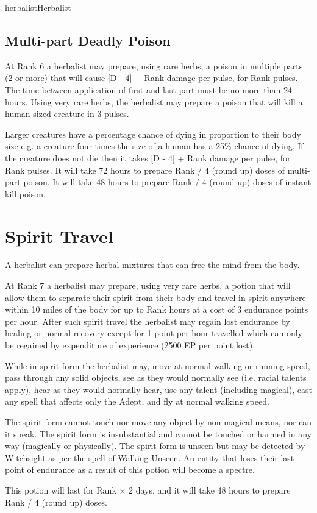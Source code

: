 \begin{Skill}[1.1]{herbalist}{Herbalist}
\subsection{Multi-part Deadly Poison}

At Rank 6 a herbalist may prepare, using rare herbs, a poison in
multiple parts (2 or more) that will cause [D - 4] + Rank damage per
pulse, for Rank pulses. The time between application of first and last
part must be no more than 24 hours. Using very rare herbs, the
herbalist may prepare a poison that will kill a human sized creature
in 3 pulses.

Larger creatures have a percentage chance of dying in proportion to
their body size e.g. a creature four times the size of a human has a
25\% chance of dying. If the creature does not die then it takes [D -
  4] + Rank damage per pulse, for Rank pulses.  It will take 72 hours
to prepare Rank / 4 (round up) doses of multi-part poison. It will
take 48 hours to prepare Rank / 4 (round up) doses of instant kill
poison.

\section{Spirit Travel}

A herbalist can prepare herbal mixtures that can free the mind from
the body.

At Rank 7 a herbalist may prepare, using very rare herbs, a potion
that will allow them to separate their spirit from their body and
travel in spirit anywhere within 10 miles of the body for up to Rank
hours at a cost of 3 endurance points per hour.  After such spirit
travel the herbalist may regain lost endurance by healing or normal
recovery except for 1 point per hour travelled which can only be
regained by expenditure of experience (2500 EP per point lost).

While in spirit form the herbalist may, move at normal walking or
running speed, pass through any solid objects, see as they would
normally see (i.e. racial talents apply), hear as they would normally
hear, use any talent (including magical), cast any spell that affects
only the Adept, and fly at normal walking speed.

The spirit form cannot touch nor move any object by non-magical means,
nor can it speak.  The spirit form is insubstantial and cannot be
touched or harmed in any way (magically or physically).  The spirit
form is unseen but may be detected by Witchsight as per the spell of
Walking Unseen. An entity that loses their last point of endurance as
a result of this potion will become a spectre.

This potion will last for Rank × 2 days, and it will take 48 hours to
prepare Rank / 4 (round up) doses.

\end{Skill}

